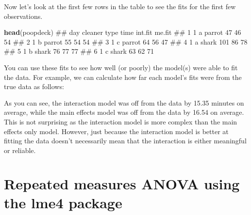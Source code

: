\documentclass[]{book}
\newenvironment{Shaded}{\begin{snugshade}}{\end{snugshade}}
\newcommand{\KeywordTok}[1]{\textcolor[rgb]{0.13,0.29,0.53}{\textbf{#1}}}
\newcommand{\StringTok}[1]{\textcolor[rgb]{0.31,0.60,0.02}{#1}}
\newcommand{\CommentTok}[1]{\textcolor[rgb]{0.56,0.35,0.01}{\textit{#1}}}
\newcommand{\OperatorTok}[1]{\textcolor[rgb]{0.81,0.36,0.00}{\textbf{#1}}}
\newcommand{\NormalTok}[1]{#1}
\theoremstyle{definition}
\theoremstyle{definition}
\theoremstyle{remark}
\begin{document}
Now let's look at the first few rows in the table to see the fits for
the first few observations.

\begin{Shaded}
\begin{Highlighting}[]
\KeywordTok{head}\NormalTok{(poopdeck)}
\NormalTok{##   day cleaner   type time int.fit me.fit}
\NormalTok{## 1   1       a parrot   47      46     54}
\NormalTok{## 2   1       b parrot   55      54     54}
\NormalTok{## 3   1       c parrot   64      56     47}
\NormalTok{## 4   1       a  shark  101      86     78}
\NormalTok{## 5   1       b  shark   76      77     77}
\NormalTok{## 6   1       c  shark   63      62     71}
\end{Highlighting}
\end{Shaded}

You can use these fits to see how well (or poorly) the model(s) were
able to fit the data. For example, we can calculate how far each model's
fits were from the true data as follows:

\begin{Shaded}
\end{Shaded}

As you can see, the interaction model was off from the data by 15.35
minutes on average, while the main effects model was off from the data
by 16.54 on average. This is not surprising as the interaction model is
more complex than the main effects only model. However, just because the
interaction model is better at fitting the data doesn't necessarily mean
that the interaction is either meaningful or reliable.

\section{Repeated measures ANOVA using the lme4
package}\label{repeated-measures-anova-using-the-lme4-package}
\end{document}
